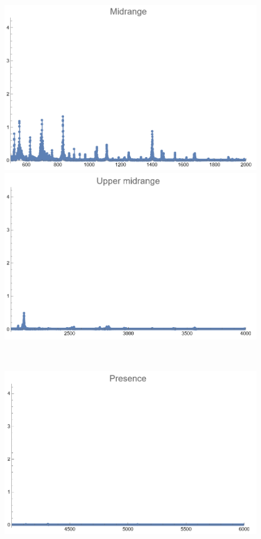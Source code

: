 \documentclass[12pt, letterpaper]{article}
\begin{document}
\begin{figure}[H]
\begin{minipage}{.3\textwidth}
  \end{minipage}
  \begin{minipage}{0.03\textwidth}\end{minipage}
  \begin{minipage}{.3\textwidth}
    \centering
    \includegraphics[width=.9\linewidth]{imgs/Cancion10/mid.png}
  \end{minipage}
  \begin{minipage}{0.03\textwidth}\end{minipage}
  \begin{minipage}{.3\textwidth}
    \centering
    \includegraphics[width=.9\linewidth]{imgs/Cancion10/upmid.png}
  \end{minipage} \medskip \\
  \begin{minipage}{.3\textwidth}
    \centering
    \includegraphics[width=.9\linewidth]{imgs/Cancion10/presence.png}

\end{minipage}
\end{figure}
\end{document}
